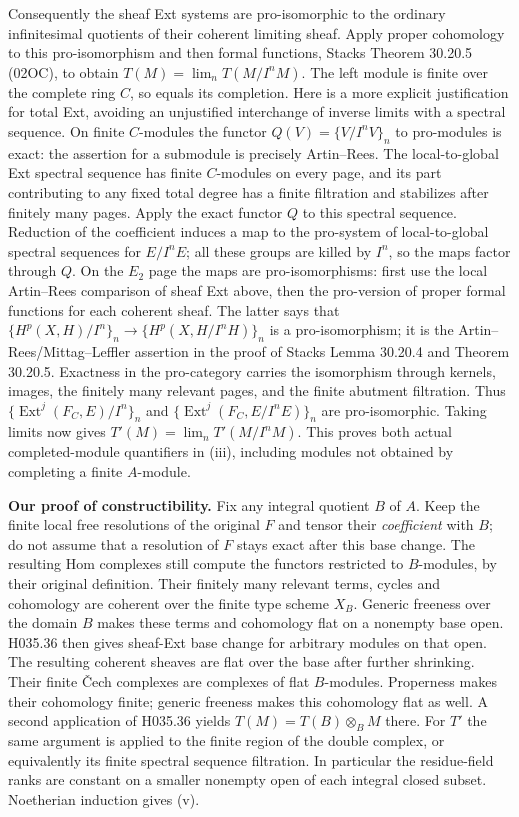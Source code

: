 Consequently the sheaf Ext systems are pro-isomorphic to the
ordinary infinitesimal quotients of their coherent limiting sheaf.
Apply proper cohomology to this pro-isomorphism and then formal
functions, Stacks Theorem 30.20.5 (02OC), to obtain
$T(M)=\lim_nT(M/I^nM)$. The left module is finite over the complete
ring $C$, so equals its completion. Here is a more explicit justification
for total Ext, avoiding an unjustified interchange of inverse limits
with a spectral sequence. On finite $C$-modules the functor
$Q(V)=\{V/I^nV\}_n$ to pro-modules is exact: the assertion for a
submodule is precisely Artin--Rees. The local-to-global Ext spectral
sequence has finite $C$-modules on every page, and its part contributing
to any fixed total degree has a finite filtration and stabilizes after
finitely many pages. Apply the exact functor $Q$ to this spectral
sequence. Reduction of the coefficient induces a map to the pro-system
of local-to-global spectral sequences for $E/I^nE$; all these groups
are killed by $I^n$, so the maps factor through $Q$.
On the $E_2$ page the maps are pro-isomorphisms: first use the local
Artin--Rees comparison of sheaf Ext above, then the pro-version of
proper formal functions for each coherent sheaf. The latter says
that $\{H^p(X,H)/I^n\}_n\to\{H^p(X,H/I^nH)\}_n$ is a
pro-isomorphism; it is the Artin--Rees/Mittag--Leffler assertion in
the proof of Stacks Lemma 30.20.4 and Theorem 30.20.5.
Exactness in the pro-category carries the isomorphism through kernels,
images, the finitely many relevant pages, and the finite abutment
filtration. Thus
$\{\operatorname{Ext}^j(F_C,E)/I^n\}_n$ and
$\{\operatorname{Ext}^j(F_C,E/I^nE)\}_n$ are pro-isomorphic.
Taking limits now gives $T'(M)=\lim_nT'(M/I^nM)$.
This proves both actual
completed-module quantifiers in (iii), including modules not obtained
by completing a finite $A$-module.

\textbf{Our proof of constructibility.} Fix any integral quotient
$B$ of $A$. Keep the finite local free resolutions of the original
$F$ and tensor their \emph{coefficient} with $B$; do not assume that
a resolution of $F$ stays exact after this base change. The resulting
Hom complexes still compute the functors restricted to $B$-modules,
by their original definition. Their finitely many relevant terms,
cycles and cohomology are coherent over the finite type scheme $X_B$.
Generic freeness over the domain $B$ makes these terms and
cohomology flat on a nonempty base open. H035.36 then gives
sheaf-Ext base change for arbitrary modules on that open. The
resulting coherent sheaves are flat over the base after further
shrinking. Their finite Čech complexes are complexes of flat
$B$-modules. Properness makes their cohomology finite; generic
freeness makes this cohomology flat as well. A second application
of H035.36 yields $T(M)=T(B)\otimes_B M$ there. For $T'$ the
same argument is applied to the finite region of the double
complex, or equivalently its finite spectral sequence filtration.
In particular the residue-field ranks are constant on a smaller
nonempty open of each integral closed subset. Noetherian induction
gives (v).

